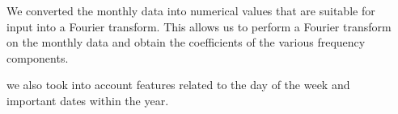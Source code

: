 \documentclass{tikzposter} %
\begin{document}
\begin{columns}
{\begin{center}
\end{center}	
\begin{description}
\item We converted the monthly data into numerical values that are suitable for input into a Fourier transform. This allows us to perform a Fourier transform on the monthly data and obtain the coefficients of the various frequency components.
\item we also took into account features related to the day of the week and important dates within the year.
\end{description}
}



\end{columns}
\end{document}
